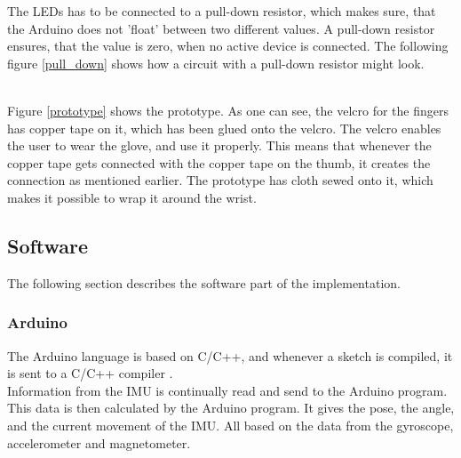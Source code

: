The LEDs has to be connected to a pull-down resistor\citep{Pulldown_res}, which makes sure, that the Arduino does not 'float' between two different values. A pull-down resistor ensures, that the value is zero, when no active device is connected.
The following figure \ref{pull_down} shows how a circuit with a pull-down resistor might look. \\


\begin{minipage}{\linewidth}%
\label{pull_down}
\end{minipage}\\

Figure \ref{prototype} shows the prototype. As one can see, the velcro for the fingers has copper tape on it, which has been glued onto the velcro. The velcro enables the user to wear the glove, and use it properly.  
This means that whenever the copper tape gets connected with the copper tape on the thumb, it creates the connection as mentioned earlier. 
The prototype has cloth sewed onto it, which makes it possible to wrap it around the wrist. \\


\subsection{Software}

The following section describes the software part of the implementation. 

\subsubsection{Arduino}
The Arduino language is based on C/C++, and whenever a sketch is compiled, it is sent to a C/C++ compiler \citep{Arduino_FAQ}.\\

Information from the IMU is continually read and send to the Arduino program. This data is then calculated by the Arduino program. It gives the pose, the angle, and the current movement of the IMU. All based on the data from the gyroscope, accelerometer and magnetometer.

